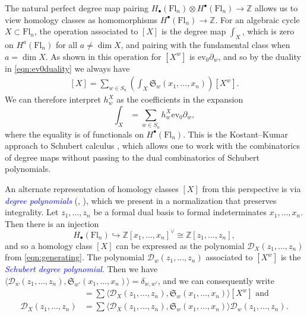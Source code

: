 \documentclass[11pt]{amsart}
\theoremstyle{definition}
\numberwithin{equation}{section}
\newcommand{\schub}[1]{\mathfrak{S}_{#1}} %
\newcommand{\ct}{\operatorname{ev_0}} %
\newcommand{\fl}[1]{\mathrm{Fl}_{#1}}
\renewcommand\emph[1]{\textcolor{blue}{\textit{#1}}} %
\begin{document}
The natural perfect degree map pairing $H_\bullet(\fl{n})\otimes H^\bullet(\fl{n})\to \mathbb{Z}$ allows us to view homology classes as homomorphisms $H^\bullet(\fl{n})\to \mathbb{Z}$. For an algebraic cycle $X\subset \fl{n}$, the operation associated to $[X]$ is the degree map $\int_X$, which is zero on $H^a(\fl{n})$ for all $a\ne \dim X$, and pairing with the fundamental class when $a=\dim X$. As shown in \cite{BGG73} this operation for $[X^w]$ is $\ct \partial_w$, and so by the duality in \eqref{eqn:ev0duality} we always have
\begin{align}\label{eq:class_of_X}
    [X]=\sum_{w\in S_n}\left(\int_X\schub{w}(x_1,\ldots,x_n)\right)[X^w].
\end{align}
We can therefore interpret $h^X_w$ as the coefficients in the expansion
$$\int_X=\sum_{w\in S_n} h^X_w \ct \partial_w,$$
where the equality is of functionals on
 $H^\bullet(\fl{n})$. This is the Kostant--Kumar approach to Schubert calculus \cite{KK86}, which allows one to work with the combinatorics of degree maps without passing to the dual combinatorics of Schubert polynomials.

An alternate representation of homology classes $[X]$ from this perspective is via \emph{degree polynomials} (\cite[Theorem 3.13]{BGG73}, \cite{PS09}), which we present in a normalization that preserves integrality. Let $z_1,\ldots,z_n$ be a formal dual basis to formal indeterminates $x_1,\ldots, x_n$. Then there is an injection $$H_\bullet(\fl{n})\hookrightarrow \mathbb{Z}[x_1,\ldots,x_n]^{\vee}\cong \mathbb{Z}[z_1,\ldots,z_n],$$
and so a homology class $[X]$ can be expressed as the polynomial $\mathcal{D}_X(z_1,\ldots,z_n)$ from \eqref{eqn:generating}. The polynomial $\mathcal{D}_w(z_1,\ldots,z_n)$ associated to $[X^w]$ is the \emph{Schubert degree polynomial}. Then we have $\langle \mathcal{D}_w(z_1,\ldots,z_n),\schub{w'}(x_1,\ldots,x_n)\rangle=\delta_{w,w'}$, and we can consequently write
\begin{align*}[X]&=\sum \langle \mathcal{D}_X(z_1,\ldots,z_n),\schub{w}(x_1,\ldots,x_n)\rangle [X^w]\text{ and }\\\mathcal{D}_X(z_1,\ldots,z_n)&=\sum \langle \mathcal{D}_X(z_1,\ldots,z_n),\schub{w}(x_1,\ldots,x_n)\rangle \mathcal{D}_w(z_1,\ldots,z_n).
\end{align*}
\end{document}
